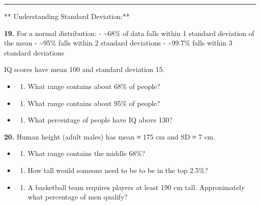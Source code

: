 \documentclass[
  11pt,
]{article}
\providecommand{\tightlist}{%
  \setlength{\itemsep}{0pt}\setlength{\parskip}{0pt}}
\begin{document}
\begin{center}\rule{0.5\linewidth}{0.5pt}\end{center}

** Understanding Standard Deviation:**

\textbf{19.} For a normal distribution: - \textasciitilde68\% of data
falls within 1 standard deviation of the mean - \textasciitilde95\%
falls within 2 standard deviations - \textasciitilde99.7\% falls within
3 standard deviations

IQ scores have mean 100 and standard deviation 15.

\begin{itemize}
\item
  \begin{enumerate}
  \def\labelenumi{(\alph{enumi})}
  \tightlist
  \item
    What range contains about 68\% of people?
  \end{enumerate}
\item
  \begin{enumerate}
  \def\labelenumi{(\alph{enumi})}
  \setcounter{enumi}{1}
  \tightlist
  \item
    What range contains about 95\% of people?
  \end{enumerate}
\item
  \begin{enumerate}
  \def\labelenumi{(\alph{enumi})}
  \setcounter{enumi}{2}
  \tightlist
  \item
    What percentage of people have IQ above 130?
  \end{enumerate}
\end{itemize}

\textbf{20.} Human height (adult males) has mean ≈ 175 cm and SD ≈ 7 cm.

\begin{itemize}
\item
  \begin{enumerate}
  \def\labelenumi{(\alph{enumi})}
  \tightlist
  \item
    What range contains the middle 68\%?
  \end{enumerate}
\item
  \begin{enumerate}
  \def\labelenumi{(\alph{enumi})}
  \setcounter{enumi}{1}
  \tightlist
  \item
    How tall would someone need to be to be in the top 2.5\%?
  \end{enumerate}
\item
  \begin{enumerate}
  \def\labelenumi{(\alph{enumi})}
  \setcounter{enumi}{2}
  \tightlist
  \item
    A basketball team requires players at least 190 cm tall.
    Approximately what percentage of men qualify?
  \end{enumerate}
\end{itemize}
\end{document}
